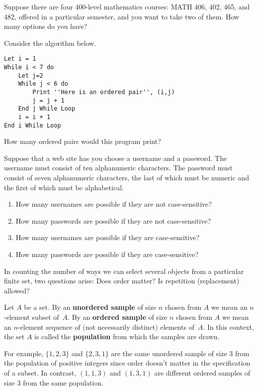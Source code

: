\begin{prb}
Suppose there are four 400-level mathematics courses: MATH 406, 402, 465, and 482, offered in a particular semester,
and you want to take two of them.  How many options do you have?
\end{prb}

\begin{prb}
Consider the algorithm below.
\begin{verbatim}
Let i = 1
While i < 7 do
    Let j=2
    While j < 6 do
        Print ''Here is an ordered pair'', (i,j)
        j = j + 1
    End j While Loop
    i = i + 1
End i While Loop
\end{verbatim}
How many ordered pairs would this program print?
\end{prb}

\begin{prb}
Suppose that a web site has you choose a username and a password.  The username must consist of ten alphanumeric
characters. The password must consist of seven alphanumeric characters, the last of which must be numeric and the
first of which must be alphabetical.
\begin{enumerate}
\item  How many usernames are possible if they are not case-sensitive?
\item  How many passwords are possible if they are not case-sensitive?
\item  How many usernames are possible if they are case-sensitive?
\item  How many passwords are possible if they are case-sensitive?
\end{enumerate}
\end{prb}

In counting the number of ways we can select several objects from a particular finite set, two questions arise: Does order matter?  Is repetition (replacement) allowed?

\begin{dfn}
Let $A$ be a set.  By an \textbf{unordered sample} of size $n$ chosen from $A$ we mean an $n$-element subset of~$A$.  By an \textbf{ordered sample} of size $n$ chosen from $A$ we mean an $n$-element sequence of $($not necessarily distinct$)$ elements of~$A$.  In this context, the set $A$ is called the \textbf{population} from which the samples are drawn.
\end{dfn}

\noindent For example, $\{1,2,3\}$ and $\{2,3,1\}$ are the same unordered sample of size 3 from the population of positive integers since order doesn't matter in the specification of a subset.  In contrast, $(1,1,3)$ and $(1,3,1)$ are different ordered samples of size 3 from the same population.

